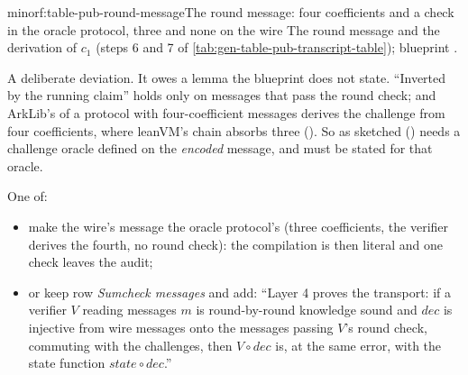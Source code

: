 \begin{finding}{minor}{f:table-pub-round-message}{The round message: four coefficients and a check in the oracle protocol, three and none on the wire}
 The round message and the derivation of $c_1$ (steps 6 and 7 of \cref{tab:gen-table-pub-transcript-table}); blueprint .

 A deliberate deviation. It owes a lemma the blueprint does not state.
``Inverted by the running claim'' holds only on messages that pass the round check; and ArkLib's
 of a protocol with four-coefficient messages derives the challenge from
four coefficients, where leanVM's chain absorbs three (). So
 as sketched () needs a challenge oracle defined on
the \emph{encoded} message, and  must be stated for that oracle.

 One of:
\begin{itemize}
\item make the wire's message the oracle protocol's (three coefficients, the verifier derives the
  fourth, no round check): the compilation is then literal and one check leaves the audit;
\item or keep row \emph{Sumcheck messages} and add: ``Layer 4 proves the transport: if a verifier
  $V$ reading messages $m$ is round-by-round knowledge sound and $\mathit{dec}$ is injective from
  wire messages onto the messages passing $V$'s round check, commuting with the challenges, then
  $V ∘ \mathit{dec}$ is, at the same error, with the state function
  $\mathit{state} ∘ \mathit{dec}$.''
\end{itemize}
\end{finding}

